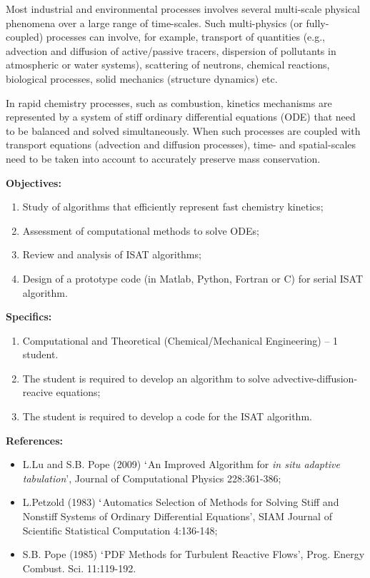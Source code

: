 \documentclass[12pts,a4paper,amsmath,amssymb,floatfix]{article}%
\newcommand{\Chem}{Chemical/Mechanical Engineering}
\begin{document}
\begin{enumerate}[label=\bfseries Project: \arabic*:]
Most industrial and environmental processes involves several multi-scale physical phenomena over a large range of time-scales. Such multi-physics (or fully-coupled) processes can involve, for example, transport of quantities (e.g., advection and diffusion of active/passive tracers, dispersion of pollutants in atmospheric or water systems), scattering of neutrons, chemical reactions, biological processes, solid mechanics (structure dynamics) etc. 

In rapid chemistry processes, such as combustion, kinetics mechanisms are represented by a system of stiff ordinary differential equations (ODE) that need to be balanced and solved simultaneously. When such processes are coupled with transport equations (advection and diffusion processes), time- and spatial-scales need to be taken into account to accurately preserve mass conservation. 

\noindent
{\bf Objectives:}
\begin{enumerate}
\item Study of algorithms that efficiently represent fast chemistry kinetics;
\item Assessment of computational methods to solve ODEs;
\item Review and analysis of ISAT algorithms;
\item Design of a prototype code (in Matlab, Python, Fortran or C) for serial ISAT algorithm.
\end{enumerate} 
 
\noindent
{\bf Specifics:} 
\begin{enumerate}
\item Computational and Theoretical (\Chem) -- 1 student.
\item The student is required to develop an algorithm to solve advective-diffusion-reacive equations;
\item The student is required to develop a code for the ISAT algorithm.
\end{enumerate}

\noindent
{\bf References:}
\begin{itemize}
\item L.Lu and S.B. Pope (2009) $\lq$An Improved Algorithm for {\it in situ adaptive tabulation}’, Journal of Computational Physics 228:361-386;
\item L.Petzold (1983) $\lq$Automatics Selection of Methods for Solving Stiff and Nonstiff Systems of Ordinary Differential Equations', SIAM Journal of Scientific Statistical Computation 4:136-148;
\item S.B. Pope (1985)  $\lq$PDF Methods for Turbulent Reactive Flows',  Prog. Energy Combust. Sci. 11:119-192.
\end{itemize}

\clearpage

\end{enumerate}
\end{document}
